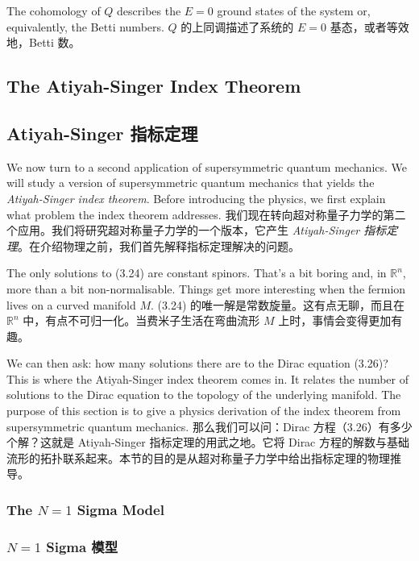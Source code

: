 \documentclass{ctexart}
\begin{document}
\begin{paracol}{2}

The cohomology of $Q$ describes the $E = 0$ ground states of the system or, equivalently, the Betti numbers.
\switchcolumn
$Q$ 的上同调描述了系统的 $E = 0$ 基态，或者等效地，Betti 数。
\switchcolumn*

\subsection{The Atiyah-Singer Index Theorem}
\switchcolumn
\subsection*{Atiyah-Singer 指标定理}
\switchcolumn*

We now turn to a second application of supersymmetric quantum mechanics. We will study a version of supersymmetric quantum mechanics that yields the \textit{Atiyah-Singer index theorem}. Before introducing the physics, we first explain what problem the index theorem addresses.
\switchcolumn
我们现在转向超对称量子力学的第二个应用。我们将研究超对称量子力学的一个版本，它产生 \textit{Atiyah-Singer 指标定理}。在介绍物理之前，我们首先解释指标定理解决的问题。
\switchcolumn*

The only solutions to (3.24) are constant spinors. That’s a bit boring and, in $\mathbb{R}^n$, more than a bit non-normalisable. Things get more interesting when the fermion lives on a curved manifold $M$.
\switchcolumn
(3.24) 的唯一解是常数旋量。这有点无聊，而且在 $\mathbb{R}^n$ 中，有点不可归一化。当费米子生活在弯曲流形 $M$ 上时，事情会变得更加有趣。
\switchcolumn*

We can then ask: how many solutions there are to the Dirac equation (3.26)? This is where the Atiyah-Singer index theorem comes in. It relates the number of solutions to the Dirac equation to the topology of the underlying manifold. The purpose of this section is to give a physics derivation of the index theorem from supersymmetric quantum mechanics.
\switchcolumn
那么我们可以问：Dirac 方程（3.26）有多少个解？这就是 Atiyah-Singer 指标定理的用武之地。它将 Dirac 方程的解数与基础流形的拓扑联系起来。本节的目的是从超对称量子力学中给出指标定理的物理推导。
\switchcolumn*

\subsubsection{The $N = 1$ Sigma Model}
\switchcolumn
\subsubsection*{$N = 1$ Sigma 模型}
\switchcolumn*


\end{paracol}
\end{document}
